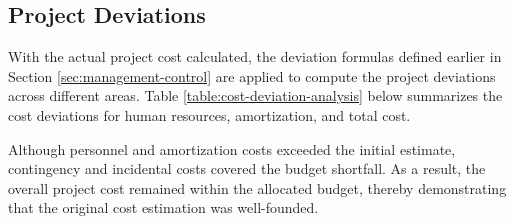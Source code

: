 \subsection{Project Deviations}
\label{project-deviations}

With the actual project cost calculated, the deviation formulas defined earlier in Section \ref{sec:management-control} are applied to compute the project deviations across different areas. Table \ref{table:cost-deviation-analysis} below summarizes the cost deviations for human resources, amortization, and total cost. 

\vspace{-10pt}

\normalsize

\begin{table}[H]
    \renewcommand{\arraystretch}{1.2}
    \centering
    \small
    \setlength{\tabcolsep}{5pt}
    \normalsize
    \caption[Project cost deviation analysis]
    {Project cost deviation analysis. [Own creation]}
    \vspace{-1em}
    \label{table:cost-deviation-analysis}
\end{table}

\vspace{-10pt}

Although personnel and amortization costs exceeded the initial estimate, contingency and incidental costs covered the budget shortfall. As a result, the overall project cost remained within the allocated budget, thereby demonstrating that the original cost estimation was well-founded.
